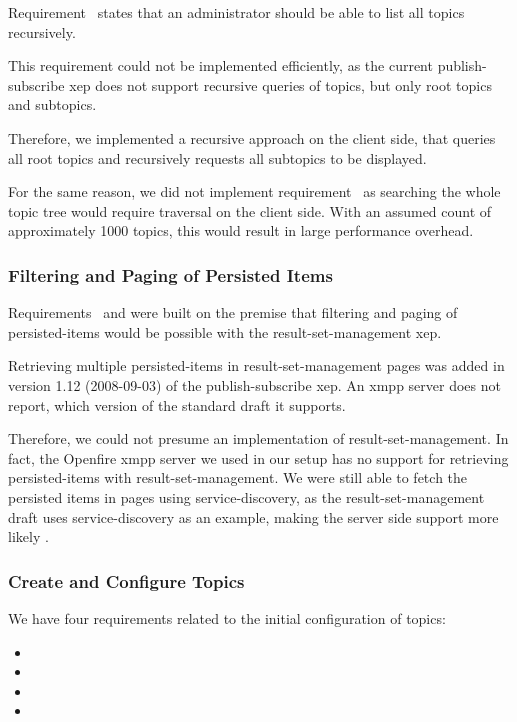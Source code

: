 Requirement~ states that an administrator should be able to list all topics recursively.

This requirement could not be implemented efficiently, as the current \gls{publish-subscribe} \gls{xep} does not support recursive queries of \glspl{topic}, but only root \glspl{topic} and subtopics.

Therefore, we implemented a recursive approach on the client side, that queries all root \glspl{topic} and recursively requests all subtopics to be displayed.

For the same reason, we did not implement requirement~ as searching the whole \gls{topic} tree would require traversal on the client side.
With an assumed count of approximately 1000 \glspl{topic}, this would result in large performance overhead.

\subsubsection{Filtering and Paging of Persisted Items}

Requirements~ and  were built on the premise that filtering and paging of \glspl{persisted-item} would be possible with the \gls{result-set-management} \gls{xep}.

Retrieving multiple \glspl{persisted-item} in \gls{result-set-management} pages was added in version 1.12 (2008-09-03) of the \gls{publish-subscribe} \gls{xep}.
An \gls{xmpp} server does not report, which version of the standard draft it supports.

Therefore, we could not presume an implementation of \gls{result-set-management}.
In fact, the Openfire \gls{xmpp} server we used in our setup has no support for retrieving \glspl{persisted-item} with \gls{result-set-management}. We were still able to fetch the persisted items in pages using \gls{service-discovery}, as the \gls{result-set-management} draft uses service-discovery as an example, making the server side support more likely \cite{xep-0059}.

\subsubsection{Create and Configure Topics}

We have four requirements related to the initial configuration of \glspl{topic}:
\begin{itemize}
  \item {}
  \item {}
  \item {}
  \item {}
\end{itemize}

